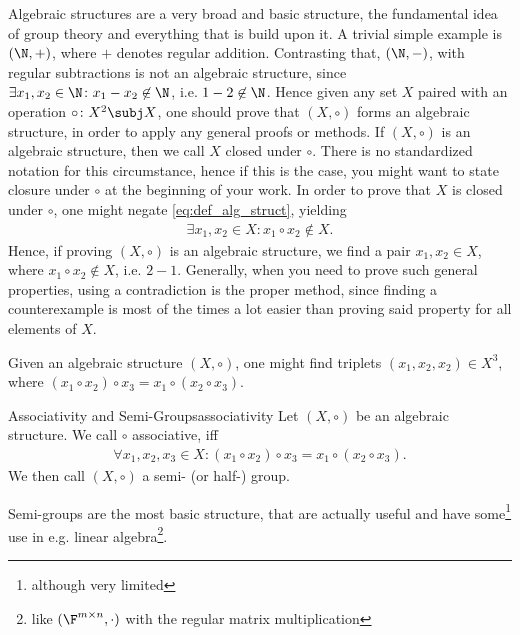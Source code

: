 Algebraic structures are a very broad and basic structure, the fundamental idea of group theory and everything that 
is build upon it. A trivial simple example is $(\N,+)$, where $+$ denotes regular addition. Contrasting that, 
$(\N,-)$, with regular subtractions is not an algebraic structure, since $\exists x_1,x_2\in\N\colon x_1-x_2\not\in\N$,
i.e. $1-2\not\in\N$. Hence given any set $X$ paired with an operation $\circ\colon X^2\subj X$, one should prove that
$(X,\circ)$ forms an algebraic structure, in order to apply any general proofs or methods. If $(X,\circ)$ is 
an algebraic structure, then we call $X$ closed under $\circ$. There is no standardized notation for this 
circumstance, hence if this is the case, you might want to state closure under $\circ$ at the beginning of your 
work. In order to prove that $X$ is closed under $\circ$, one might negate \cref{eq:def_alg_struct}, yielding
\begin{align}
    \exists x_1,x_2\in X\colon x_1\circ x_2\not\in X.\label{eq:neg_def_alg_struct}
\end{align}
Hence, if proving $(X,\circ)$ is an algebraic structure, we find a pair $x_1,x_2\in X$, where $x_1\circ x_2\not\in X$,
i.e. $2-1$. Generally, when you need to prove such general properties, using a contradiction is the proper method, since
finding a counterexample is most of the times a lot easier than proving said property for all elements of $X$.

Given an algebraic structure $(X,\circ)$, one might find triplets $(x_1,x_2,x_2)\in X^3$, where 
$(x_1\circ x_2) \circ x_3 = x_1\circ (x_2\circ x_3)$.

\begin{definition}{Associativity and Semi-Groups}{associativity}
    Let $(X,\circ)$ be an algebraic structure. We call $\circ$ associative, iff
    \begin{align}
        \forall x_1,x_2,x_3 \in X \colon (x_1\circ x_2) \circ x_3 = x_1 \circ (x_2 \circ x_3).\label{eq:def_associativity}
    \end{align}
    We then call $(X,\circ)$ a semi- (or half-) group.
\end{definition}

Semi-groups are the most basic structure, that are actually useful and have some\footnote{although very limited} use 
in e.g. linear algebra\footnote{like $(\F^{m\times n},\cdot)$ with the regular matrix multiplication}.


